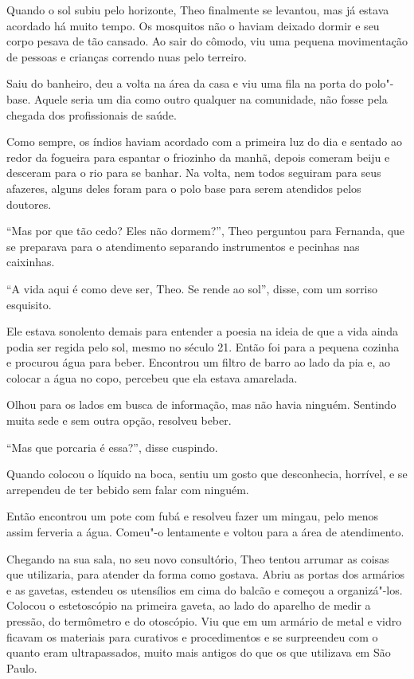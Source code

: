 Quando o sol subiu pelo horizonte, Theo finalmente se levantou, mas já
estava acordado há muito tempo. Os mosquitos não o haviam deixado dormir
e seu corpo pesava de tão cansado. Ao sair do cômodo, viu uma pequena
movimentação de pessoas e crianças correndo nuas pelo terreiro.

Saiu do banheiro, deu a volta na área da casa e viu uma fila na
porta do polo"-base. Aquele seria um dia como outro qualquer na
comunidade, não fosse pela chegada dos profissionais de saúde.

Como sempre, os índios haviam acordado com a primeira luz do
dia e sentado ao redor da fogueira para espantar o friozinho da manhã,
depois comeram beiju e desceram para o rio para se banhar. Na volta, nem todos
seguiram para seus afazeres, alguns deles foram para o polo base para
serem atendidos pelos doutores.

``Mas por que tão cedo? Eles não dormem?'', Theo perguntou para
Fernanda, que se preparava para o atendimento separando instrumentos e
pecinhas nas caixinhas.

``A vida aqui é como deve ser, Theo. Se rende ao sol'', disse, com um
sorriso esquisito.

Ele estava sonolento demais para entender a poesia na ideia de que a
vida ainda podia ser regida pelo sol, mesmo no século 21. Então foi para
a pequena cozinha e procurou água para beber. Encontrou um filtro de barro
ao lado da pia e, ao colocar a água no copo, percebeu que ela estava
amarelada.

Olhou para os lados em busca de informação, mas não havia ninguém.
Sentindo muita sede e sem outra opção, resolveu beber.

``Mas que porcaria é essa?'', disse cuspindo.

Quando colocou o líquido na boca, sentiu um gosto que desconhecia,
horrível, e se arrependeu de ter bebido sem falar com ninguém.

Então encontrou um pote com fubá e resolveu fazer um mingau, pelo menos
assim ferveria a água. Comeu"-o lentamente e voltou para a área de
atendimento.

Chegando na sua sala, no seu novo consultório, Theo tentou arrumar as
coisas que utilizaria, para atender da forma como gostava. Abriu as
portas dos armários e as gavetas, estendeu os utensílios em cima do
balcão e começou a organizá"-los. Colocou o estetoscópio na primeira
gaveta, ao lado do aparelho de medir a pressão, do termômetro e do
otoscópio. Viu que em um armário de metal e vidro ficavam os materiais
para curativos e procedimentos e se surpreendeu com o quanto
eram ultrapassados, muito mais antigos do que os que utilizava em
São Paulo.

